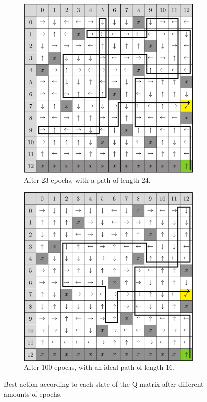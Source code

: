 \renewcommand{\textuparrow}{\ensuremath{\upa{}}}
\renewcommand{\textdownarrow}{\ensuremath{\downa{}}}
\renewcommand{\textleftarrow}{\ensuremath{\lefta{}}}
\renewcommand{\textrightarrow}{\ensuremath{\righta{}}}
\begin{figure}[H]
	\centering
	\begin{subfigure}[t]{.42\textwidth}
		\includegraphics[width=\textwidth]{bad_map.png}
		\caption{After 23 epochs, with a path of length 24.}
	\end{subfigure}
	\begin{subfigure}[t]{.42\textwidth}
		\includegraphics[width=\textwidth]{good_map.png}
		\caption{After 100 epochs, with an ideal path of length 16.}
	\end{subfigure}
	\caption{Best action according to each state of the Q-matrix after different amounts of epochs.}
\end{figure}

